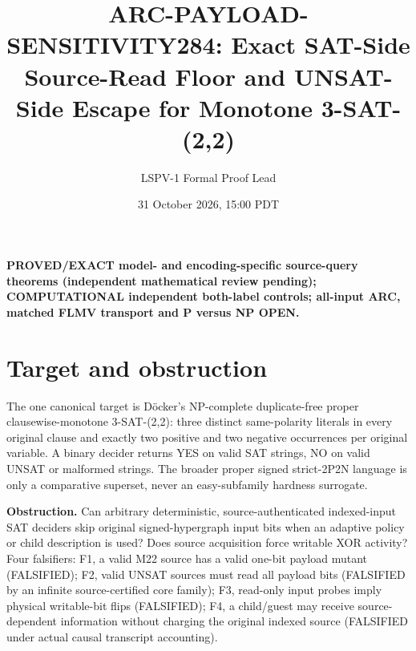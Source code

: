 \documentclass[11pt]{article}
\title{ARC-PAYLOAD-SENSITIVITY284: Exact SAT-Side Source-Read Floor and UNSAT-Side Escape for Monotone 3-SAT-(2,2)}
\author{LSPV-1 Formal Proof Lead}
\date{31 October 2026, 15:00 PDT}
\begin{document}
\maketitle
\begin{center}
\textbf{PROVED/EXACT model- and encoding-specific source-query theorems (independent mathematical review pending); COMPUTATIONAL independent both-label controls; all-input ARC, matched FLMV transport and P versus NP OPEN.}
\end{center}
\section{Target and obstruction}
The one canonical target is D\"ocker's NP-complete duplicate-free proper clausewise-monotone 3-SAT-(2,2): three distinct same-polarity literals in every original clause and exactly two positive and two negative occurrences per original variable. A binary decider returns YES on valid SAT strings, NO on valid UNSAT or malformed strings. The broader proper signed strict-2P2N language is only a comparative superset, never an easy-subfamily hardness surrogate.

\textbf{Obstruction.} Can arbitrary deterministic, source-authenticated indexed-input SAT deciders skip original signed-hypergraph input bits when an adaptive policy or child description is used? Does source acquisition force writable XOR activity? Four falsifiers: F1, a valid M22 source has a valid one-bit payload mutant (FALSIFIED); F2, valid UNSAT sources must read all payload bits (FALSIFIED by an infinite source-certified core family); F3, read-only input probes imply physical writable-bit flips (FALSIFIED); F4, a child/guest may receive source-dependent information without charging the original indexed source (FALSIFIED under actual causal transcript accounting).
\end{document}
